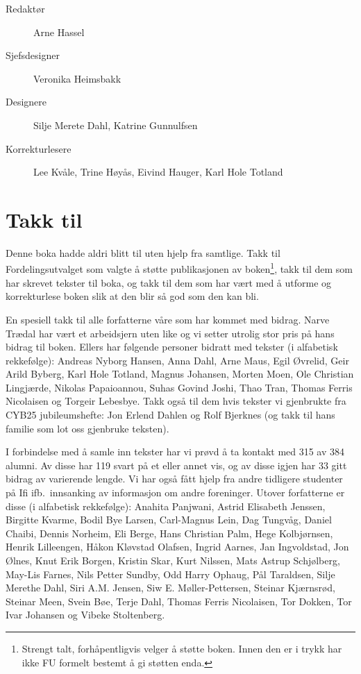 \begin{description}
	\item[Redaktør] Arne Hassel
	\item[Sjefsdesigner] Veronika Heimsbakk
	\item[Designere] Silje Merete Dahl, Katrine Gunnulfsen
	\item[Korrekturlesere] Lee Kvåle, Trine Høyås, Eivind Hauger, Karl Hole Totland
\end{description}

\section*{Takk til}

Denne boka hadde aldri blitt til uten hjelp fra samtlige. Takk til Fordelingsutvalget som valgte å støtte publikasjonen av boken\footnote{Strengt talt, forhåpentligvis velger å støtte boken. Innen den er i trykk har ikke FU formelt bestemt å gi støtten enda.}, takk til dem som har skrevet tekster til boka, og takk til dem som har vært med å utforme og korrekturlese boken slik at den blir så god som den kan bli.

En spesiell takk til alle forfatterne våre som har kommet med bidrag. Narve Trædal har vært et arbeidsjern uten like og vi setter utrolig stor pris på hans bidrag til boken. Ellers har følgende personer bidratt med tekster (i alfabetisk rekkefølge): Andreas Nyborg Hansen, Anna Dahl, Arne Maus, Egil Øvrelid, Geir Arild Byberg, Karl Hole Totland, Magnus Johansen, Morten Moen, Ole Christian Lingjærde, Nikolas Papaioannou, Suhas Govind Joshi, Thao Tran, Thomas Ferris Nicolaisen og Torgeir Lebesbye. Takk også til dem hvis tekster vi gjenbrukte fra CYB25 jubileumshefte: Jon Erlend Dahlen og Rolf Bjerknes (og takk til hans familie som lot oss gjenbruke teksten).

I forbindelse med å samle inn tekster har vi prøvd å ta kontakt med 315 av 384 alumni. Av disse har 119 svart på et eller annet vis, og av disse igjen har 33 gitt bidrag av varierende lengde. Vi har også fått hjelp fra andre tidligere studenter på Ifi ifb.~innsanking av informasjon om andre foreninger. Utover forfatterne er disse (i alfabetisk rekkefølge): Anahita Panjwani, Astrid Elisabeth Jenssen, Birgitte Kvarme, Bodil Bye Larsen, Carl-Magnus Lein, Dag Tungvåg, Daniel Chaibi, Dennis Norheim, Eli Berge, Hans Christian Palm, Hege Kolbjørnsen, Henrik Lilleengen, Håkon Kløvstad Olafsen, Ingrid Aarnes, Jan Ingvoldstad, Jon Ølnes, Knut Erik Borgen, Kristin Skar, Kurt Nilssen, Mats Astrup Schjølberg, May-Lis Farnes, Nils Petter Sundby, Odd Harry Ophaug, Pål Taraldsen, Silje Merethe Dahl, Siri A.M. Jensen, Siw E. Møller-Pettersen, Steinar Kjærnsrød, Steinar Meen, Svein Bøe, Terje Dahl, Thomas Ferris Nicolaisen, Tor Dokken, Tor Ivar Johansen og Vibeke Stoltenberg.

